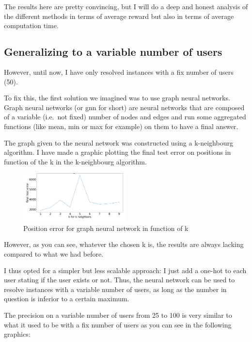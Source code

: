 \documentclass[letterpaper]{article}
\begin{document}
The results here are pretty convincing, but I will do a deep and honest analysis of the different methods in terms
of average reward but also in terms of average computation time.

\subsection{Generalizing to a variable number of users}

However, until now, I have only resolved instances with a fix number of users (50).

To fix this, the first solution we imagined was to use graph neural networks.
Graph neural networks (or gnn for short) are neural networks that are composed of a variable (i.e.\, not fixed) number
of nodes and edges and run some aggregated functions (like mean, min or max for example) on them to have a final answer.

The graph given to the neural network was constructed using a k-neighbourg algorithm.
I have made a graphic plotting the final test error on positions in function of the k in the k-neighbourg algorithm.

\begin{figure}[H]
    \centering
    \includegraphics[width=0.5\textwidth]{images/knn_for_gnn.png}
    \caption{Position error for graph neural network in function of k}
\end{figure}

However, as you can see, whatever the chosen k is, the results are always lacking compared to what we had before.

I thus opted for a simpler but less scalable approach: I just add a one-hot to each user stating if the user exists or not.
Thus, the neural network can be used to resolve instances with a variable number of users, as long as the number in question is inferior to a certain maximum.

The precision on a variable number of users from 25 to 100 is very similar to what it used to be with a fix number of users as you can see in the following graphics:
\end{document}
